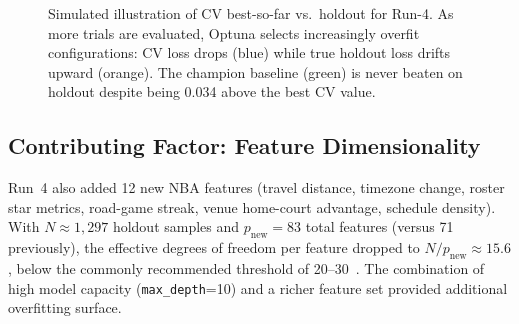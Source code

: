 \documentclass[conference]{IEEEtran}
\begin{document}
\begin{figure}[t]
\centering
{}
\caption{Simulated illustration of CV best-so-far vs.\ holdout for
Run-4.  As more trials are evaluated, Optuna selects increasingly
overfit configurations: CV loss drops (blue) while true holdout loss
drifts upward (orange).  The champion baseline (green) is never
beaten on holdout despite being 0.034 above the best CV value.}
\label{fig:selection_bias}
\end{figure}

\subsection{Contributing Factor: Feature Dimensionality}

Run~4 also added 12 new NBA features (travel distance, timezone change,
roster star metrics, road-game streak, venue home-court advantage,
schedule density).  With $N{\approx}1{,}297$ holdout samples and
$p_\text{new}{=}83$ total features (versus 71 previously), the
effective degrees of freedom per feature dropped to
$N/p_\text{new} \approx 15.6$, below the commonly recommended
threshold of 20--30~\cite{harrell2015}.  The combination of high
model capacity (\texttt{max\_depth}=10) and a richer feature set
provided additional overfitting surface.
\end{document}
